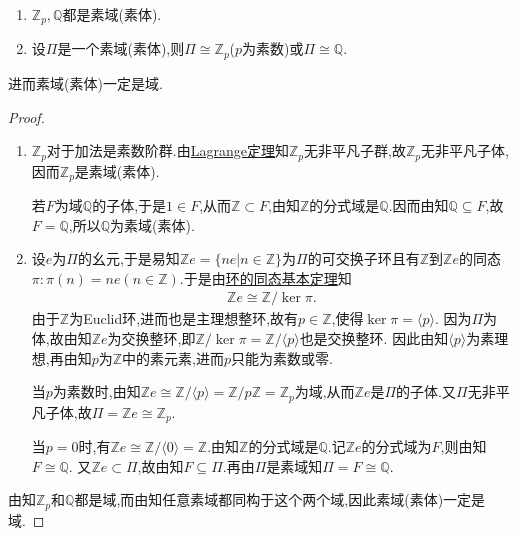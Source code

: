 \documentclass[../../main.tex]{subfiles}%
\begin{document}
\begin{theorem}\label{theorem:抽象代数--定理3.1.1}
\begin{enumerate}[(1)]
\item\label{theorem:抽象代数--定理3.1.1-1} $\mathbb{Z}_p,\mathbb{Q}$都是素域(素体).

\item\label{theorem:抽象代数--定理3.1.1-2} 设$\Pi$是一个素域(素体),则$\Pi\cong\mathbb{Z}_p$($p$为素数)或$\Pi\cong\mathbb{Q}$.
\end{enumerate}
进而素域(素体)一定是域.
\end{theorem}
\begin{proof}
\begin{enumerate}[(1)]
\item $\mathbb{Z}_p$对于加法是素数阶群.由\hyperref[theorem:抽象代数--Lagrange定理]{Lagrange定理}知$\mathbb{Z}_p$无非平凡子群,故$\mathbb{Z}_p$无非平凡子体,因而$\mathbb{Z}_p$是素域(素体).

若$F$为域$\mathbb{Q}$的子体,于是$1\in F$,从而$\mathbb{Z}\subset F$,由知$\mathbb{Z}$的分式域是$\mathbb{Q}$.因而由知$\mathbb{Q}\subseteq F$,故$F=\mathbb{Q}$,所以$\mathbb{Q}$为素域(素体).

\item 设$e$为$\Pi$的幺元,于是易知$\mathbb{Z}e=\{ne|n\in\mathbb{Z}\}$为$\Pi$的可交换子环且有$\mathbb{Z}$到$\mathbb{Z}e$的同态$\pi:\pi(n)=ne(n\in\mathbb{Z})$.于是由\hyperref[theorem:环的同态基本定理]{环的同态基本定理}知
\begin{align*}
\mathbb{Z}e\cong \mathbb{Z}/\ker\pi.
\end{align*}
由于$\mathbb{Z}$为Euclid环,进而也是主理想整环,故有$p\in \mathbb{Z}$,使得$\ker\pi=\langle p\rangle $.
因为$\Pi$为体,故由知$\mathbb{Z}e$为交换整环,即$\mathbb{Z}/\ker\pi=\mathbb{Z}/\langle p\rangle$也是交换整环.
因此由知$\langle p\rangle$为素理想,再由知$p$为$\mathbb{Z}$中的素元素,进而$p$只能为素数或零.

当$p$为素数时,由知$\mathbb{Z}e\cong \mathbb{Z}/\langle p\rangle=\mathbb{Z}/p\mathbb{Z} = \mathbb{Z}_p$为域,从而$\mathbb{Z}e$是$\Pi$的子体.又$\Pi$无非平凡子体,故$\Pi=\mathbb{Z}e\cong\mathbb{Z}_p$.

当$p=0$时,有$\mathbb{Z}e\cong \mathbb{Z}/\langle 0\rangle=\mathbb{Z}$.由知$\mathbb{Z}$的分式域是$\mathbb{Q}$.记$\mathbb{Z}e$的分式域为$F$,则由知$F\cong \mathbb{Q}$.
又$\mathbb{Z}e\subset \Pi$,故由知$F\subseteq \Pi$.再由$\Pi$是素域知$\Pi=F\cong\mathbb{Q}$.
\end{enumerate}
由知$\mathbb{Z}_p$和$\mathbb{Q}$都是域,而由知任意素域都同构于这个两个域,因此素域(素体)一定是域.

\end{proof}
\end{document}
